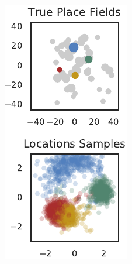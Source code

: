 \begin{figure}[t!]
\begin{center}
    \begin{subfigure}[T]{1.4in}
      \caption{}
      \vspace{-1em}
      \includegraphics[width=\textwidth]{figures/ch3/locations_0} 

\end{subfigure}
\end{center}
\end{figure}
